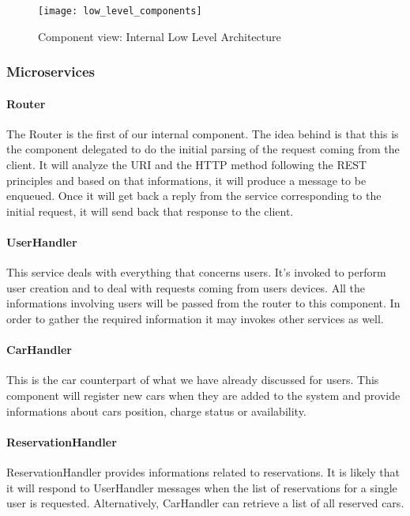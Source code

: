 \begin{sidewaysfigure}
\centering
\texttt{[image: low\_level\_components]}
\caption{Component view: Internal Low Level Architecture}
\label{fig:i_l_l_comp}
\end{sidewaysfigure}

\pagebreak
\subsubsection{Microservices}
\paragraph{Router}
The Router is the first of our internal component. The idea behind is that this is the component
delegated to do the initial parsing of the request coming from the client. It will analyze
the URI and the HTTP method following the REST principles and based on that informations,
it will produce a message to be enqueued. Once it will get back a reply from the service
corresponding to the initial request, it will send back that response to the client.

\paragraph{UserHandler}
This service deals with everything that concerns users. It's invoked to perform user creation
and to deal with requests coming from users devices. All the informations involving users
will be passed from the router to this component. In order to gather the required information
it may invokes other services as well.

\paragraph{CarHandler}
This is the car counterpart of what we have already discussed for users. This component will
register new cars when they are added to the system and provide informations about cars
position, charge status or availability.

\paragraph{ReservationHandler}
ReservationHandler provides informations related to reservations. It is likely that it will
respond to UserHandler messages when the list of reservations for a single user is requested.
Alternatively, CarHandler can retrieve a list of all reserved cars. 

